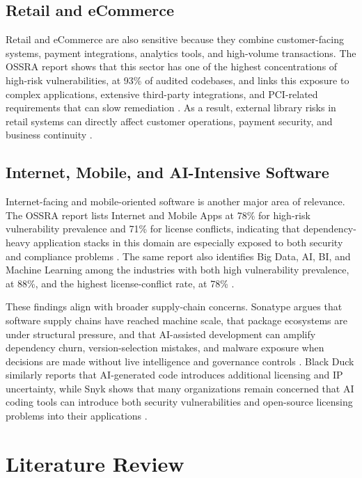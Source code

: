 \documentclass[12pt,a4paper]{report}
\begin{document}
\section{Retail and eCommerce}
Retail and eCommerce are also sensitive because they combine customer-facing systems, payment integrations, analytics tools, and high-volume transactions. The OSSRA report shows that this sector has one of the highest concentrations of high-risk vulnerabilities, at 93\% of audited codebases, and links this exposure to complex applications, extensive third-party integrations, and PCI-related requirements that can slow remediation \parencite{OpenSourceSecurity2026}. As a result, external library risks in retail systems can directly affect customer operations, payment security, and business continuity \parencite{OpenSourceSecurity2026,2026StateSoftware2026}.

\section{Internet, Mobile, and AI-Intensive Software}
Internet-facing and mobile-oriented software is another major area of relevance. The OSSRA report lists Internet and Mobile Apps at 78\% for high-risk vulnerability prevalence and 71\% for license conflicts, indicating that dependency-heavy application stacks in this domain are especially exposed to both security and compliance problems \parencite{OpenSourceSecurity2026}. The same report also identifies Big Data, AI, BI, and Machine Learning among the industries with both high vulnerability prevalence, at 88\%, and the highest license-conflict rate, at 78\% \parencite{OpenSourceSecurity2026}.

These findings align with broader supply-chain concerns. Sonatype argues that software supply chains have reached machine scale, that package ecosystems are under structural pressure, and that AI-assisted development can amplify dependency churn, version-selection mistakes, and malware exposure when decisions are made without live intelligence and governance controls \parencite{2026StateSoftware2026}. Black Duck similarly reports that AI-generated code introduces additional licensing and IP uncertainty, while Snyk shows that many organizations remain concerned that AI coding tools can introduce both security vulnerabilities and open-source licensing problems into their applications \parencite{OpenSourceSecurity2026,2024StateOpen2024,2026StateSoftware2026}.


\chapter{Literature Review}
\end{document}
